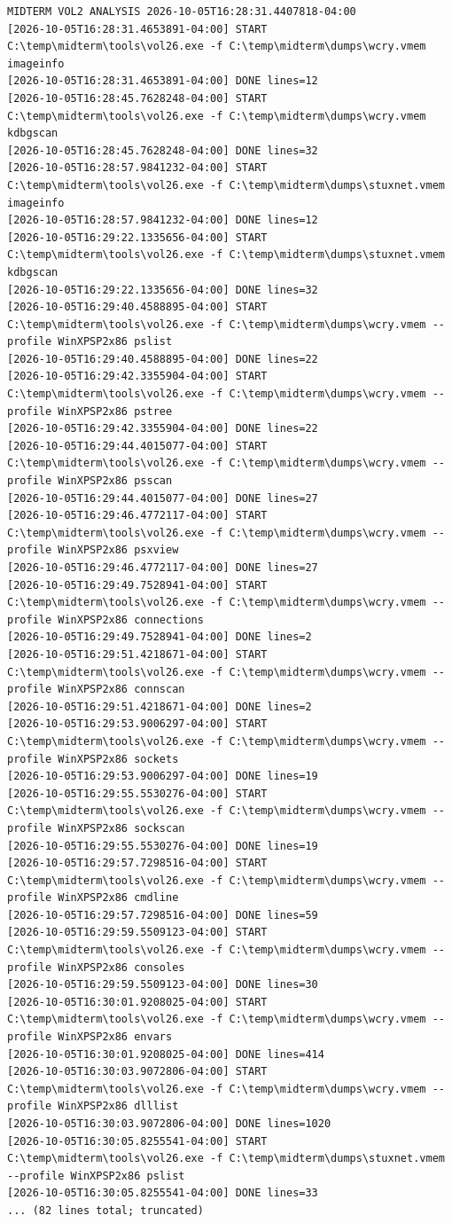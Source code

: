 \documentclass[11pt,letterpaper]{article}
\begin{document}
\begin{lstlisting}
MIDTERM VOL2 ANALYSIS 2026-10-05T16:28:31.4407818-04:00
[2026-10-05T16:28:31.4653891-04:00] START C:\temp\midterm\tools\vol26.exe -f C:\temp\midterm\dumps\wcry.vmem imageinfo
[2026-10-05T16:28:31.4653891-04:00] DONE lines=12
[2026-10-05T16:28:45.7628248-04:00] START C:\temp\midterm\tools\vol26.exe -f C:\temp\midterm\dumps\wcry.vmem kdbgscan
[2026-10-05T16:28:45.7628248-04:00] DONE lines=32
[2026-10-05T16:28:57.9841232-04:00] START C:\temp\midterm\tools\vol26.exe -f C:\temp\midterm\dumps\stuxnet.vmem imageinfo
[2026-10-05T16:28:57.9841232-04:00] DONE lines=12
[2026-10-05T16:29:22.1335656-04:00] START C:\temp\midterm\tools\vol26.exe -f C:\temp\midterm\dumps\stuxnet.vmem kdbgscan
[2026-10-05T16:29:22.1335656-04:00] DONE lines=32
[2026-10-05T16:29:40.4588895-04:00] START C:\temp\midterm\tools\vol26.exe -f C:\temp\midterm\dumps\wcry.vmem --profile WinXPSP2x86 pslist
[2026-10-05T16:29:40.4588895-04:00] DONE lines=22
[2026-10-05T16:29:42.3355904-04:00] START C:\temp\midterm\tools\vol26.exe -f C:\temp\midterm\dumps\wcry.vmem --profile WinXPSP2x86 pstree
[2026-10-05T16:29:42.3355904-04:00] DONE lines=22
[2026-10-05T16:29:44.4015077-04:00] START C:\temp\midterm\tools\vol26.exe -f C:\temp\midterm\dumps\wcry.vmem --profile WinXPSP2x86 psscan
[2026-10-05T16:29:44.4015077-04:00] DONE lines=27
[2026-10-05T16:29:46.4772117-04:00] START C:\temp\midterm\tools\vol26.exe -f C:\temp\midterm\dumps\wcry.vmem --profile WinXPSP2x86 psxview
[2026-10-05T16:29:46.4772117-04:00] DONE lines=27
[2026-10-05T16:29:49.7528941-04:00] START C:\temp\midterm\tools\vol26.exe -f C:\temp\midterm\dumps\wcry.vmem --profile WinXPSP2x86 connections
[2026-10-05T16:29:49.7528941-04:00] DONE lines=2
[2026-10-05T16:29:51.4218671-04:00] START C:\temp\midterm\tools\vol26.exe -f C:\temp\midterm\dumps\wcry.vmem --profile WinXPSP2x86 connscan
[2026-10-05T16:29:51.4218671-04:00] DONE lines=2
[2026-10-05T16:29:53.9006297-04:00] START C:\temp\midterm\tools\vol26.exe -f C:\temp\midterm\dumps\wcry.vmem --profile WinXPSP2x86 sockets
[2026-10-05T16:29:53.9006297-04:00] DONE lines=19
[2026-10-05T16:29:55.5530276-04:00] START C:\temp\midterm\tools\vol26.exe -f C:\temp\midterm\dumps\wcry.vmem --profile WinXPSP2x86 sockscan
[2026-10-05T16:29:55.5530276-04:00] DONE lines=19
[2026-10-05T16:29:57.7298516-04:00] START C:\temp\midterm\tools\vol26.exe -f C:\temp\midterm\dumps\wcry.vmem --profile WinXPSP2x86 cmdline
[2026-10-05T16:29:57.7298516-04:00] DONE lines=59
[2026-10-05T16:29:59.5509123-04:00] START C:\temp\midterm\tools\vol26.exe -f C:\temp\midterm\dumps\wcry.vmem --profile WinXPSP2x86 consoles
[2026-10-05T16:29:59.5509123-04:00] DONE lines=30
[2026-10-05T16:30:01.9208025-04:00] START C:\temp\midterm\tools\vol26.exe -f C:\temp\midterm\dumps\wcry.vmem --profile WinXPSP2x86 envars
[2026-10-05T16:30:01.9208025-04:00] DONE lines=414
[2026-10-05T16:30:03.9072806-04:00] START C:\temp\midterm\tools\vol26.exe -f C:\temp\midterm\dumps\wcry.vmem --profile WinXPSP2x86 dlllist
[2026-10-05T16:30:03.9072806-04:00] DONE lines=1020
[2026-10-05T16:30:05.8255541-04:00] START C:\temp\midterm\tools\vol26.exe -f C:\temp\midterm\dumps\stuxnet.vmem --profile WinXPSP2x86 pslist
[2026-10-05T16:30:05.8255541-04:00] DONE lines=33
... (82 lines total; truncated)
\end{lstlisting}
\end{document}
